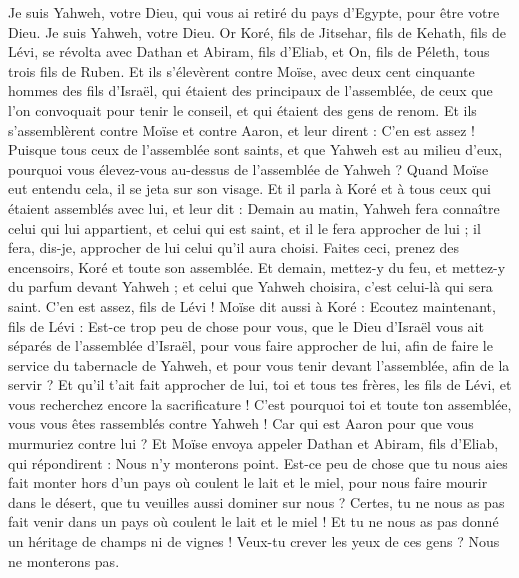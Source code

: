\begin{multicols}{2}
Je suis Yahweh, votre Dieu, qui vous ai retiré du pays d'Egypte, pour être votre Dieu. Je suis Yahweh, votre Dieu.
\VerseOne{}Or Koré, fils de Jitsehar, fils de Kehath, fils de Lévi, se révolta avec Dathan et Abiram, fils d'Eliab, et On, fils de Péleth, tous trois fils de Ruben.
Et ils s’élevèrent contre Moïse, avec deux cent cinquante hommes des fils d'Israël, qui étaient des principaux de l'assemblée, de ceux que l'on convoquait pour tenir le conseil, et qui étaient des gens de renom.
Et ils s'assemblèrent contre Moïse et contre Aaron, et leur dirent : C'en est assez ! Puisque tous ceux de l’assemblée sont saints, et que Yahweh est au milieu d'eux, pourquoi vous élevez-vous au-dessus de l'assemblée de Yahweh ?
Quand Moïse eut entendu cela, il se jeta sur son visage.
Et il parla à Koré et à tous ceux qui étaient assemblés avec lui, et leur dit : Demain au matin, Yahweh fera connaître celui qui lui appartient, et celui qui est saint, et il le fera approcher de lui ; il fera, dis-je, approcher de lui celui qu’il aura choisi.
Faites ceci, prenez des encensoirs, Koré et toute son assemblée.
Et demain, mettez-y du feu, et mettez-y du parfum devant Yahweh ; et celui que Yahweh choisira, c'est celui-là qui sera saint. C'en est assez, fils de Lévi !
Moïse dit aussi à Koré : Ecoutez maintenant, fils de Lévi :
Est-ce trop peu de chose pour vous, que le Dieu d'Israël vous ait séparés de l'assemblée d'Israël, pour vous faire approcher de lui, afin de faire le service du tabernacle de Yahweh, et pour vous tenir devant l'assemblée, afin de la servir ?
Et qu'il t'ait fait approcher de lui, toi et tous tes frères, les fils de Lévi, et vous recherchez encore la sacrificature !
C'est pourquoi toi et toute ton assemblée, vous vous êtes rassemblés contre Yahweh ! Car qui est Aaron pour que vous murmuriez contre lui ?
Et Moïse envoya appeler Dathan et Abiram, fils d'Eliab, qui répondirent : Nous n'y monterons point.
Est-ce peu de chose que tu nous aies fait monter hors d’un pays où coulent le lait et le miel, pour nous faire mourir dans le désert, que tu veuilles aussi dominer sur nous ?
Certes, tu ne nous as pas fait venir dans un pays où coulent le lait et le miel ! Et tu ne nous as pas donné un héritage de champs ni de vignes ! Veux-tu crever les yeux de ces gens ? Nous ne monterons pas.

\end{multicols}
